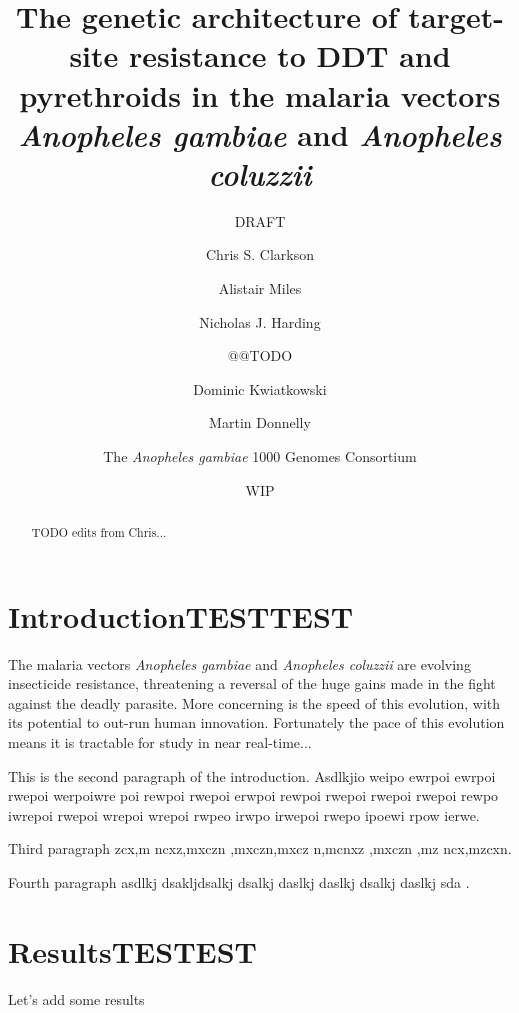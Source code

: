 \documentclass[a4paper,10pt,abstracton]{scrartcl}
\title{
The genetic architecture of target-site resistance to DDT and pyrethroids in the malaria vectors \emph{Anopheles gambiae} and \emph{Anopheles coluzzii}
}
\subtitle{DRAFT}
\date{WIP}
\author[1]{Chris S. Clarkson}
\author[2,1]{Alistair Miles}
\author[2]{Nicholas J. Harding}
\author{@@TODO}
\author[1,2]{Dominic Kwiatkowski}
\author[3,1]{Martin Donnelly}
\author[4]{The \emph{Anopheles gambiae} 1000 Genomes Consortium}
\affil[1]{Sanger @@TODO}
\affil[2]{Oxford @@TODO}
\affil[3]{Liverpool @@TODO}
\affil[4]{MalariaGEN @@TODO}
\begin{document}
\maketitle

\begin{abstract}

TODO edits from Chris...

\end{abstract}

\section*{IntroductionTESTTEST}

The malaria vectors \emph{Anopheles gambiae} and \emph{Anopheles coluzzii} are evolving insecticide resistance, threatening a reversal of the huge gains made in the fight against the deadly parasite. More concerning is the speed of this evolution, with its potential to out-run human innovation. Fortunately the pace of this evolution means it is tractable for study in near real-time...

This is the second paragraph of the introduction.
%
Asdlkjio weipo ewrpoi ewrpoi rwepoi werpoiwre poi rewpoi rwepoi erwpoi rewpoi rwepoi rwepoi rwepoi rewpo iwrepoi rwepoi wrepoi wrepoi rwpeo irwpo irwepoi rwepo ipoewi rpow ierwe.

Third paragraph zcx,m ncxz,mxczn ,mxczn,mxcz n,mcnxz ,mxczn ,mz ncx,mzcxn.

Fourth paragraph asdlkj dsakljdsalkj dsalkj daslkj daslkj dsalkj daslkj sda \cite{Garud2015}.


\section*{ResultsTESTEST}

Let's add some results

\begin{landscape}
\begin{table}[h]
  \small
  \centering
  
  \caption{
\textbf{Non-synonymous mutations in the voltage-gated sodium channel gene}. 
%
All mutations are at 5\% frequency or above in one or more of the 9 Ag1000G phase 1 populations, with the exception of \texttt{2,400,071 G>T} which is only found in the CM\emph{Ag} population at 0.4\% frequency but is included because another mutation (\texttt{2,400,071 G>A}) is found at the same position causing the same amino acid substitution (\texttt{M490I}). 
%
Substitutions marked with an asterisk (*) failed conservative variant filters applied genome-wide in the Ag1000G phase 1 AR3 callset, but appeared sound on manual inspection of read alignments.
}
  \label{table:variants_missense}
\end{table}
\end{landscape}
\end{document}
